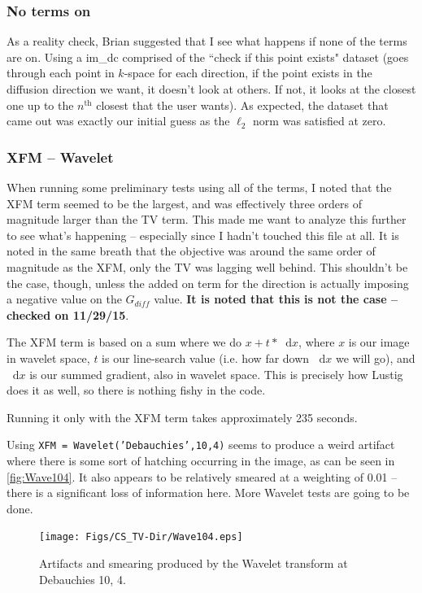 \documentclass[11 pt]{article}
\newcommand*\diff{\mathop{}\!\mathrm{d}}
\begin{document}
    \subsubsection{No terms on}

      As a reality check, Brian suggested that I see what happens if none of the terms are on. Using a im\_dc comprised of the ``check if this point exists" dataset (goes through each point in $k$-space for each direction, if the point exists in the diffusion direction we want, it doesn't look at others. If not, it looks at the closest one up to the $n^\text{th}$ closest that the user wants). As expected, the dataset that came out was exactly our initial guess as the $\ell_2$ norm was satisfied at zero.

    \subsubsection{XFM -- Wavelet}

      When running some preliminary tests using all of the terms, I noted that the XFM term seemed to be the largest, and was effectively three orders of magnitude larger than the TV term. This made me want to analyze this further to see what's happening -- especially since I hadn't touched this file at all. It is noted in the same breath that the objective was around the same order of magnitude as the XFM, only the TV was lagging well behind. This shouldn't be the case, though, unless the added on term for the direction is actually imposing a negative value on the $G_{diff}$ value. \textbf{It is noted that this is not the case -- checked on 11/29/15}.

      The XFM term is based on a sum where we do $x + t*\diff x$, where $x$ is our image in wavelet space, $t$ is our line-search value (i.e. how far down $\diff x$ we will go), and $\diff x$ is our summed gradient, also in wavelet space. This is precisely how Lustig does it as well, so there is nothing fishy in the code. 

      Running it only with the XFM term takes approximately 235 seconds.

      Using \texttt{XFM = Wavelet('Debauchies',10,4)} seems to produce a weird artifact where there is some sort of hatching occurring in the image, as can be seen in \autoref{fig:Wave104}.  It also appears to be relatively smeared at a weighting of 0.01 -- there is a significant loss of information here. More Wavelet tests are going to be done. 

      \begin{figure}[h] 

        \centering
        \vspace{0pt}
        \setlength\fboxsep{0pt}
        \setlength\fboxrule{0.5pt}
        \texttt{[image: Figs/CS\_TV-Dir/Wave104.eps]}
        \caption{Artifacts and smearing produced by the Wavelet transform at Debauchies 10, 4.}
        \label{fig:Wave104}

        \end{figure}
\end{document}
